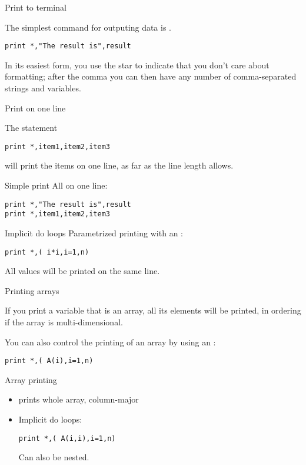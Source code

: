  {Print to terminal}

The simplest command for outputing data is .
\begin{lstlisting}
print *,"The result is",result
\end{lstlisting}
In its easiest form, you use the star to indicate that you don't care
about formatting; after the comma you can then have any number of
comma-separated strings and variables.

 {Print on one line}

The statement
\begin{lstlisting}
print *,item1,item2,item3
\end{lstlisting}
will print the items on one line, as far as the line length allows.

\begin{slide}{Simple print}
  \label{sl:fio-print}
  All on one line:
\begin{lstlisting}
print *,"The result is",result
print *,item1,item2,item3
\end{lstlisting}
\end{slide}

\begin{block}{Implicit do loops}
  \label{sl:print-implicit-loop}
  Parametrized printing with an :
\begin{lstlisting}
print *,( i*i,i=1,n)
\end{lstlisting}
All values will be printed on the same line.
\end{block}

 {Printing arrays}

If you print a variable that is an array, all its elements will be
printed, in  ordering if the array is
multi-dimensional.

You can also control the printing of an array by using an
:
\begin{lstlisting}
print *,( A(i),i=1,n)
\end{lstlisting}

\begin{slide}{Array printing}
  \label{sl:fprint-array}
  \begin{itemize}
  \item {} prints whole array, column-major
  \item Implicit do loops:
\begin{lstlisting}
print *,( A(i,i),i=1,n)
\end{lstlisting}
  Can also be nested.
  \end{itemize}
\end{slide}

